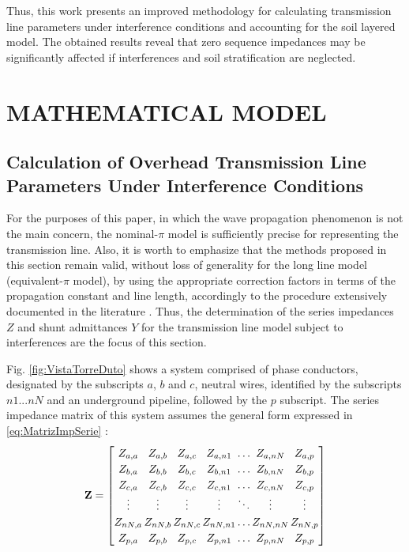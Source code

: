 \documentclass[conference]{IEEEtran}
\begin{document}
	Thus, this work presents an improved methodology for calculating transmission line parameters under interference conditions and accounting for the soil layered model. The obtained results reveal that zero sequence impedances may be significantly affected if interferences and soil stratification are neglected. 
	
	
	\section{MATHEMATICAL MODEL}
	\subsection{Calculation of Overhead Transmission Line Parameters Under Interference Conditions}
	For the purposes of this paper, in which the wave propagation phenomenon is not the main concern, the nominal-$\pi$ model is sufficiently precise for representing the transmission line. Also, it is worth to emphasize that the methods proposed in this section remain valid, without loss of generality for the long line model (equivalent-$\pi$ model), by using the appropriate correction factors in terms of the propagation constant and line length, accordingly to the procedure extensively documented in the literature \cite{Saadat1999,Stevenson1994}. Thus, the determination of the series impedances $Z$ and shunt admittances $Y$ for the transmission line model subject to interferences are the focus of this section.
	
	Fig. \ref{fig:VistaTorreDuto} shows a system comprised of phase conductors, designated by the subscripts $a$, $b$ and $c$, neutral wires, identified by the subscripts $n1...nN$ and an underground pipeline,  followed by the $p$ subscript. The series impedance matrix of this system assumes the general form expressed in \eqref{eq:MatrizImpSerie} \cite{Stevenson1994}:
	\begin{equation}\label{eq:MatrizImpSerie}
		\arraycolsep=0.8pt %
		\medmuskip = -2mu %
		\def\arraystretch{1.2}
		\mathbf{Z}
		=
		\begin{bmatrix}
			Z_{a,a} & Z_{a,b} & Z_{a,c} & Z_{a,n1} & \ldots & Z_{a,nN} & Z_{a,p}  \\
			Z_{b,a} & Z_{b,b} & Z_{b,c} & Z_{b,n1} & \ldots & Z_{b,nN} & Z_{b,p}  \\
			Z_{c,a} & Z_{c,b} & Z_{c,c} & Z_{c,n1} & \ldots & Z_{c,nN} & Z_{c,p}  \\
			\vdots & \vdots & \vdots & \vdots & \ddots & \vdots & \vdots  \\
			Z_{nN,a} & Z_{nN,b} & Z_{nN,c} & Z_{nN,n1} & \ldots & Z_{nN,nN} & Z_{nN,p}  \\
			Z_{p,a} & Z_{p,b} & Z_{p,c} & Z_{p,n1} & \ldots & Z_{p,nN} & Z_{p,p}  \\
		\end{bmatrix}
	\end{equation}
	
\end{document}
